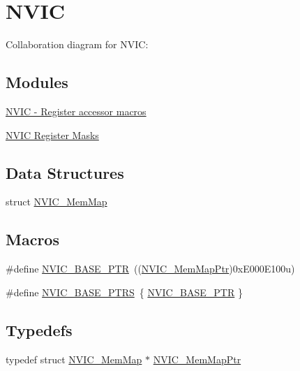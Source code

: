 \hypertarget{group___n_v_i_c___peripheral}{}\section{N\+V\+IC}
\label{group___n_v_i_c___peripheral}
Collaboration diagram for N\+V\+IC\+:
\subsection*{Modules}
\begin{DoxyCompactItemize}
\item 
\hyperlink{group___n_v_i_c___register___accessor___macros}{N\+V\+I\+C -\/ Register accessor macros}
\item 
\hyperlink{group___n_v_i_c___register___masks}{N\+V\+I\+C Register Masks}
\end{DoxyCompactItemize}
\subsection*{Data Structures}
\begin{DoxyCompactItemize}
\item 
struct \hyperlink{struct_n_v_i_c___mem_map}{N\+V\+I\+C\+\_\+\+Mem\+Map}
\end{DoxyCompactItemize}
\subsection*{Macros}
\begin{DoxyCompactItemize}
\item 
\#define \hyperlink{group___n_v_i_c___peripheral_ga28f0a055d0c218e16d1fc7b13ff0caa5}{N\+V\+I\+C\+\_\+\+B\+A\+S\+E\+\_\+\+P\+TR}~((\hyperlink{group___n_v_i_c___peripheral_ga685d87c766bb24fb3330aa8cc48fa0e7}{N\+V\+I\+C\+\_\+\+Mem\+Map\+Ptr})0x\+E000\+E100u)
\item 
\#define \hyperlink{group___n_v_i_c___peripheral_ga25b6ce0c871e09199e515cbb1716fe26}{N\+V\+I\+C\+\_\+\+B\+A\+S\+E\+\_\+\+P\+T\+RS}~\{ \hyperlink{group___n_v_i_c___peripheral_ga28f0a055d0c218e16d1fc7b13ff0caa5}{N\+V\+I\+C\+\_\+\+B\+A\+S\+E\+\_\+\+P\+TR} \}
\end{DoxyCompactItemize}
\subsection*{Typedefs}
\begin{DoxyCompactItemize}
\item 
typedef struct \hyperlink{struct_n_v_i_c___mem_map}{N\+V\+I\+C\+\_\+\+Mem\+Map} $\ast$ \hyperlink{group___n_v_i_c___peripheral_ga685d87c766bb24fb3330aa8cc48fa0e7}{N\+V\+I\+C\+\_\+\+Mem\+Map\+Ptr}
\end{DoxyCompactItemize}


